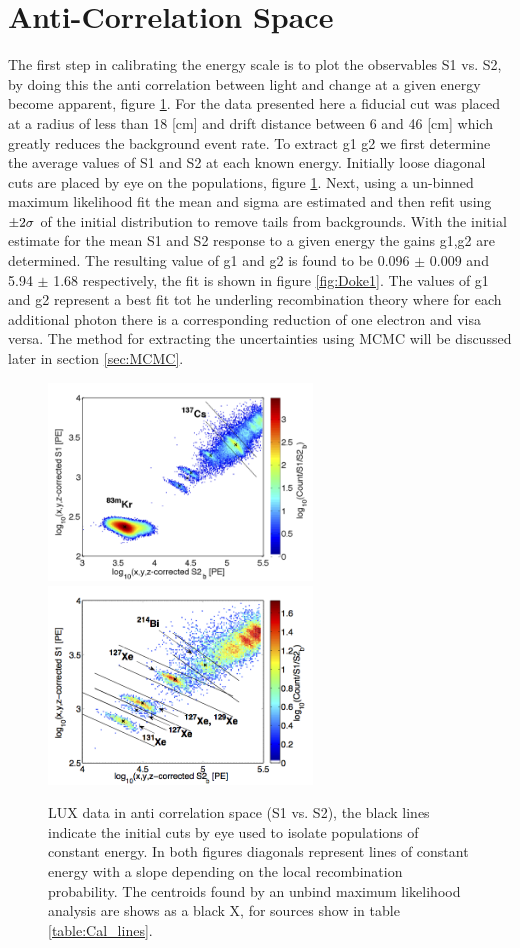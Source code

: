 \section{Anti-Correlation Space}
The first step in calibrating the energy scale is to plot the observables S1 vs. S2, by doing this the anti correlation between light and change at a given energy become apparent, figure \ref{fig:S1S2_space}. For the data presented here a fiducial cut was placed at a radius of less than 18 [cm] and drift distance between 6 and 46 [cm] which greatly reduces the background event rate. To extract g1 g2 we first determine the average values of S1 and S2 at each known energy. Initially loose diagonal cuts are placed by eye on the populations, figure \ref{fig:S1S2_space}. Next, using a un-binned maximum likelihood fit the mean and sigma are estimated and then refit using $\rm \pm 2\sigma$ of the initial distribution to remove tails from backgrounds. With the initial estimate for the mean S1 and S2 response to a given energy the gains g1,g2 are determined. The resulting value of g1 and g2 is found to be 0.096 $\pm$ 0.009 and 5.94 $\pm$ 1.68 respectively, the fit is shown in figure \ref{fig:Doke1}. The values of g1 and g2 represent a best fit tot he underling recombination theory where for each additional photon there is a corresponding reduction of one electron and visa versa. The method for extracting the uncertainties using MCMC will be discussed later in section \ref{sec:MCMC}.

\begin{figure}[h!]\centering
\includegraphics[width=70mm]{Chapter_E_Scale/Figures/S1S2_density_Kr_Cs_fit.png}
\includegraphics[width=70mm]{Chapter_E_Scale/Figures/S1S2_density_XeA_fit.png}
\caption{LUX data in anti correlation space (S1 vs. S2), the black lines indicate the initial cuts by eye used to isolate populations of constant energy. In both figures diagonals represent lines of constant energy with a slope depending on the local recombination probability. The centroids found by an unbind maximum likelihood analysis are shows as a black X, for sources show in table \ref{table:Cal_lines}. }
\label{fig:S1S2_space}
\end{figure}

